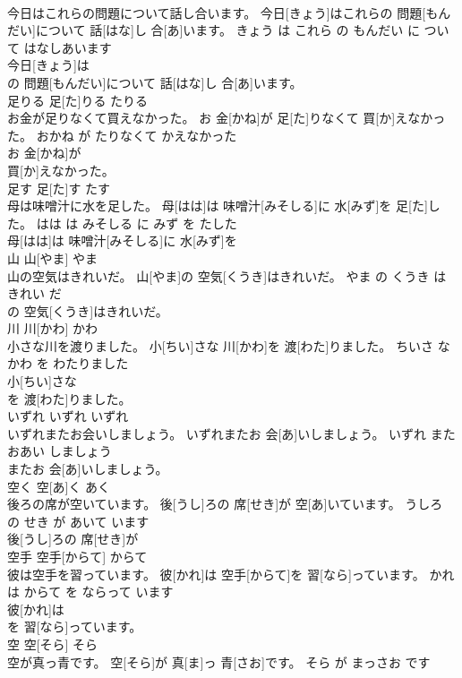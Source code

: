 \documentclass[8pt]{extreport}
\begin{document}
\begin{CJK}{UTF8}{min}
\\	今日はこれらの問題について話し合います。	今日[きょう]はこれらの 問題[もんだい]について 話[はな]し 合[あ]います。	きょう は これら の もんだい に ついて はなしあいます	
\\	今日[きょう]は
\\	の 問題[もんだい]について 話[はな]し 合[あ]います。		
\\	足りる	足[た]りる	たりる	
\\	お金が足りなくて買えなかった。	お 金[かね]が 足[た]りなくて 買[か]えなかった。	おかね が たりなくて かえなかった	
\\	お 金[かね]が
\\	買[か]えなかった。		
\\	足す	足[た]す	たす	
\\	母は味噌汁に水を足した。	母[はは]は 味噌汁[みそしる]に 水[みず]を 足[た]した。	はは は みそしる に みず を たした	
\\	母[はは]は 味噌汁[みそしる]に 水[みず]を
\\	山	山[やま]	やま	
\\	山の空気はきれいだ。	山[やま]の 空気[くうき]はきれいだ。	やま の くうき は きれい だ	
\\	の 空気[くうき]はきれいだ。		
\\	川	川[かわ]	かわ	
\\	小さな川を渡りました。	小[ちい]さな 川[かわ]を 渡[わた]りました。	ちいさ な かわ を わたりました	
\\	小[ちい]さな
\\	を 渡[わた]りました。		
\\	いずれ	いずれ	いずれ	
\\	いずれまたお会いしましょう。	いずれまたお 会[あ]いしましょう。	いずれ また おあい しましょう	
\\	またお 会[あ]いしましょう。		
\\	空く	空[あ]く	あく	
\\	後ろの席が空いています。	後[うし]ろの 席[せき]が 空[あ]いています。	うしろ の せき が あいて います	
\\	後[うし]ろの 席[せき]が
\\	空手	空手[からて]	からて	
\\	彼は空手を習っています。	彼[かれ]は 空手[からて]を 習[なら]っています。	かれ は からて を ならって います	
\\	彼[かれ]は
\\	を 習[なら]っています。		
\\	空	空[そら]	そら	
\\	空が真っ青です。	空[そら]が 真[ま]っ 青[さお]です。	そら が まっさお です	

\end{CJK}
\end{document}
